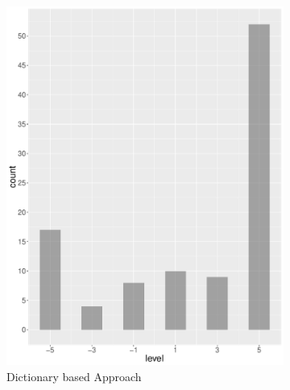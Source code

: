\begin{figure}
\begin{subfigure}[b]{0.4\textwidth}
        \includegraphics[width=\textwidth]{plots/climate_change/hist_level_es}
        \caption{Dictionary based Approach}
        \label{fig:hist_level_climate_change_es}
    \end{subfigure}
    ~
    \begin{subfigure}[b]{0.4\textwidth}

\end{subfigure}
\end{figure}
